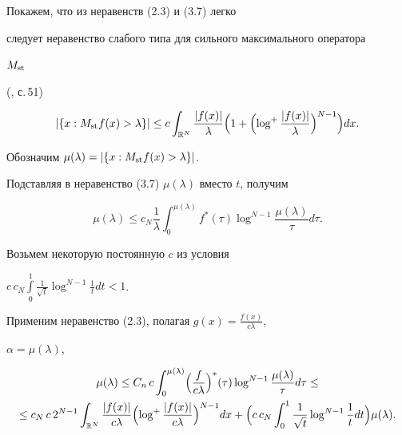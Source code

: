  


\begin{notenonum} Покажем, что из неравенств (2.3) и (3.7) легко 


следует неравенство слабого типа для сильного максимального оператора 


$M_{\operatorname{st}}$ 


(\cite{Guz2}, с.\,51) 


\begin{equation} 


|\{x:M_{\st} f(x)>\lambda\}| \le c\int_{\Bbb R^N} 


\frac{|f(x)|}{\lambda}\Bigl(1+\Bigl(\log^+ 


\frac{|f(x)|}{\lambda}\Bigr)^{N-1}\Bigr)dx. 


\end{equation} 


\end{notenonum} 


 


Обозначим $\mu(\lambda)=|\{x:M_{\operatorname{st}} f(x)>\lambda\}|$. 


Подставляя в неравенство (3.7) $\mu(\lambda)$ вместо $t$, получим 


$$ 


\mu(\lambda)\le c_N\frac{1}{\lambda}\int_0^{\mu(\lambda)}f^*(\tau) 


\log^{N-1}\frac{\mu(\lambda)}{\tau}d\tau. 


$$ 


Возьмем некоторую постоянную $c$ из условия 


$c\, c_N\int\limits_0^1\frac{1}{\sqrt t}\log^{N-1}\frac{1}{t}dt<1$. 


Применим неравенство (2.3), полагая $g(x)=\frac{f(x)}{c\lambda}$, 


$\alpha=\mu(\lambda)$,


\begin{gather*} 


\mu(\lambda)\le C_n\, c\int_0^{\mu(\lambda)}\Bigl(\frac{f}{c\lambda} 


\Bigr)^*(\tau)\log^{N-1}\frac{\mu(\lambda)}{\tau}d\tau \le\\ 


% 


\le c_N\, c\, 2^{N-1}\int_{\Bbb R^N}\frac{|f(x)|}{c\lambda} 


\Bigl(\log^+\frac{|f(x)|}{c\lambda}\Bigr)^{N-1}dx+ 


\Bigl( c\, c_N\int_0^1\frac{1}{\sqrt t}\log^{N-1} 


\frac{1}{t}dt\Bigr)\mu(\lambda). 


\end{gather*} 


